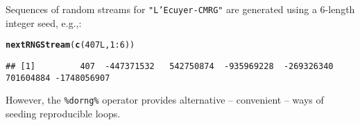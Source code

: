 \documentclass[a4paper,12pt]{article}\usepackage[]{graphicx}\usepackage[]{color}
\makeatletter
\newcommand{\hlnum}[1]{\textcolor[rgb]{0.686,0.059,0.569}{#1}}%
\newcommand{\hlopt}[1]{\textcolor[rgb]{0,0,0}{#1}}%
\newcommand{\hlstd}[1]{\textcolor[rgb]{0.345,0.345,0.345}{#1}}%
\newcommand{\hlkwd}[1]{\textcolor[rgb]{0.737,0.353,0.396}{\textbf{#1}}}%
\newenvironment{kframe}{%
 \def\at@end@of@kframe{}%
 \ifinner\ifhmode%
  \def\at@end@of@kframe{\end{minipage}}%
  \begin{minipage}{\columnwidth}%
 \fi\fi%
 \def\FrameCommand##1{\hskip\@totalleftmargin \hskip-\fboxsep
 \colorbox{shadecolor}{##1}\hskip-\fboxsep
     \hskip-\linewidth \hskip-\@totalleftmargin \hskip\columnwidth}%
 \MakeFramed {\advance\hsize-\width
   \@totalleftmargin\z@ \linewidth\hsize
   \@setminipage}}%
 {\par\unskip\endMakeFramed%
 \at@end@of@kframe}
\newenvironment{knitrout}{}{} %
\let\code=\texttt
\makeatother
\begin{document}
Sequences of random streams for \code{"L'Ecuyer-CMRG"} are generated
using a 6-length integer seed, e.g.,:
\begin{knitrout}\footnotesize
{}\color{fgcolor}\begin{kframe}
\begin{alltt}
\hlkwd{nextRNGStream}\hlstd{(}\hlkwd{c}\hlstd{(}\hlnum{407L}\hlstd{,} \hlnum{1}\hlopt{:}\hlnum{6}\hlstd{))}
\end{alltt}
\begin{verbatim}
## [1]         407  -447371532   542750874  -935969228  -269326340   701604884 -1748056907
\end{verbatim}
\end{kframe}
\end{knitrout}

However, the \code{\%dorng\%} operator provides alternative -- convenient --
ways of seeding reproducible loops.
\end{document}
